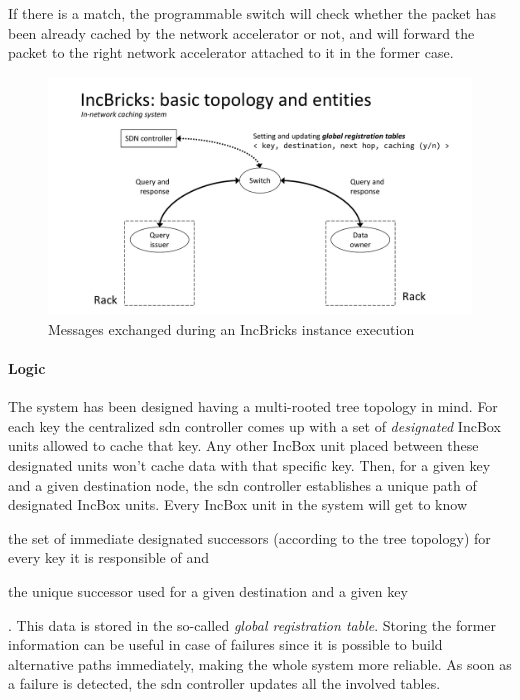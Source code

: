 If there is a match, the programmable switch will check whether the packet has been already cached by the network accelerator or not, and will forward the packet to the right network accelerator attached to it in the former case.

\begin{figure}[!htb]
    \centering
        \includegraphics[page=4, clip, trim=4.1cm 0.1cm 4.3cm 0.1cm, width=1.00\textwidth]{figures/analysis/inp/solutions.pdf}
    \caption{Messages exchanged during an IncBricks \texorpdfstring{\cite{incbricks}}{} instance execution}
\end{figure}

\paragraph{Logic}
The system has been designed having a multi-rooted tree topology in mind.
For each key the centralized \gls{sdn} controller comes up with a set of \textit{designated} IncBox units allowed to cache that key.
Any other IncBox unit placed between these designated units won't cache data with that specific key.
Then, for a given key and a given destination node, the \gls{sdn} controller establishes a unique path of designated IncBox units.
Every IncBox unit in the system will get to know
\begin{mylist}
    \item the set of immediate designated successors (according to the tree topology) for every key it is responsible of and
    \item the unique successor used for a given destination and a given key
\end{mylist}.
This data is stored in the so-called \textit{global registration table}.
Storing the former information can be useful in case of failures since it is possible to build alternative paths immediately, making the whole system more reliable.
As soon as a failure is detected, the \gls{sdn} controller updates all the involved tables.

